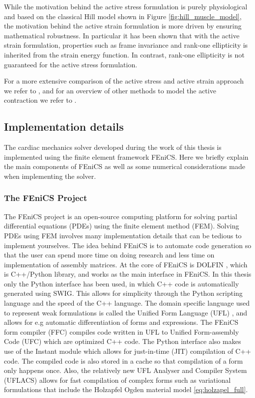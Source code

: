 While the motivation behind the active stress formulation is purely
physiological and based on the classical Hill model shown in Figure
\ref{fig:hill_muscle_model}, the motivation behind the active strain
formulation is more driven by ensuring mathematical robustness. In
particular it has been shown \cite{ambrosi2012active} that with the
active strain formulation, properties such as frame invariance and
rank-one ellipticity is inherited from the strain energy function. In
contrast, rank-one ellipticity is not guaranteed for the active stress
formulation.

For a more extensive comparison of the active stress and active strain
approach we refer to \cite{ambrosi2012active,giantesio2017comparison},
and for an overview of other methods to model the active contraction
we refer to \cite{goriely2017five}.



\subsection{Implementation details}
The cardiac mechanics solver developed during the work of this thesis
is implemented using the finite element framework FEniCS. Here we
briefly explain the main components of FEniCS as well as some
numerical considerations made when implementing the solver.


\subsubsection{The FEniCS Project}
\label{sec:fenics}

The FEniCS project is an open-source computing platform for solving
partial differential equations (PDEs) using the finite element method (FEM).
Solving PDEs using FEM involves many implementation details that can
be tedious to implement yourselves. The idea behind FEniCS is to
automate code generation so that the user can spend more time on doing
research and less time on implementation of assembly matrices. At the
core of FEniCS is DOLFIN \cite{logg2012dolfin}, which is C++/Python
library, and works as the main interface in FEniCS. In this thesis
only the Python interface has been used, in which C++ code is
automatically generated using SWIG. This allows for simplicity through
the Python scripting language and the speed of the C++ language.
The domain specific language used to represent weak formulations is
called the Unified Form Language (UFL) \cite{alnaes2014unified}, and
allows for e.g automatic differentiation of forms and expressions. The
FEniCS form compiler (FFC) \cite{logg2012ffc} compiles code written in
UFL to Unified Form-assembly Code (UFC) \cite{alnaes2012ufc} which are
optimized C++ code. The Python interface also makes use of the Instant
module which allows for just-in-time (JIT) compilation of C++
code. The compiled code is also stored in a cache so that compilation
of a form only happens once. Also, the relatively new UFL Analyser and
Compiler System (UFLACS) allows for fast compilation of complex forms
such as variational formulations that include the Holzapfel Ogden
material model \eqref{eq:holzapel_full}. 


